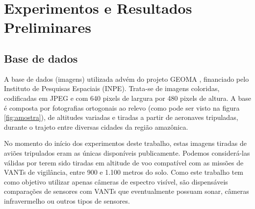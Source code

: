 \chapter{Experimentos e Resultados Preliminares}\label{cap:experimentos}

\section{Base de dados}

A base de dados (imagens) utilizada advém do projeto GEOMA \cite{geoma}, financiado pelo Instituto de Pesquisas Espaciais (INPE). Trata-se de imagens coloridas, codificadas em JPEG e com 640 pixels de largura por 480 pixels de altura. A base é composta por fotografias ortogonais ao relevo (como pode ser visto na figura \ref{fig:amostra}), de altitudes variadas e tiradas a partir de aeronaves tripuladas, durante o trajeto entre diversas cidades da região amazônica.

No momento do início dos experimentos deste trabalho, estas imagens tiradas de aviões tripulados eram as únicas disponíveis publicamente. Podemos considerá-las válidas por terem sido tiradas em altitude de voo compatível com as missões de VANTs de vigilância, entre 900 e 1.100 metros do solo. Como este trabalho tem como objetivo utilizar apenas câmeras de espectro visível, são dispensáveis comparações de sensores com VANTs que eventualmente possuam sonar, câmeras infravermelho ou outros tipos de sensores.

